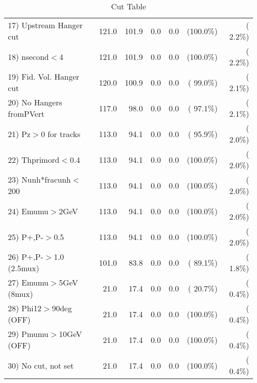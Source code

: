 \begin{table}[h!]
\begin{tabular}{||l||r|r|r|r|r|r||}
 17) Upstream Hanger cut  &        121.0 &        101.9 &          0.0 &          0.0 & (100.0\%) & (  2.2\%) \\
 18) nsecond$<$4          &        121.0 &        101.9 &          0.0 &          0.0 & (100.0\%) & (  2.2\%) \\
 19) Fid. Vol. Hanger cut &        120.0 &        100.9 &          0.0 &          0.0 & ( 99.0\%) & (  2.1\%) \\
 20) No Hangers fromPVert &        117.0 &         98.0 &          0.0 &          0.0 & ( 97.1\%) & (  2.1\%) \\
 21) Pz$>$0 for tracks    &        113.0 &         94.1 &          0.0 &          0.0 & ( 95.9\%) & (  2.0\%) \\
 22) Thprimord$<$0.4      &        113.0 &         94.1 &          0.0 &          0.0 & (100.0\%) & (  2.0\%) \\
 23) Nunh*fracunh$<$200   &        113.0 &         94.1 &          0.0 &          0.0 & (100.0\%) & (  2.0\%) \\
 24) Emumu$>$2GeV         &        113.0 &         94.1 &          0.0 &          0.0 & (100.0\%) & (  2.0\%) \\
 25) P+,P-$>$0.5          &        113.0 &         94.1 &          0.0 &          0.0 & (100.0\%) & (  2.0\%) \\
 26) P+,P-$>$1.0 (2.5mux) &        101.0 &         83.8 &          0.0 &          0.0 & ( 89.1\%) & (  1.8\%) \\
 27) Emumu$>$5GeV  (8mux) &         21.0 &         17.4 &          0.0 &          0.0 & ( 20.7\%) & (  0.4\%) \\
 28) Phi12$>$90deg  (OFF) &         21.0 &         17.4 &          0.0 &          0.0 & (100.0\%) & (  0.4\%) \\
 29) Pmumu$>$10GeV  (OFF) &         21.0 &         17.4 &          0.0 &          0.0 & (100.0\%) & (  0.4\%) \\
 30) No cut, not set      &         21.0 &         17.4 &          0.0 &          0.0 & (100.0\%) & (  0.4\%) \\
 \hline
 \hline
 \end{tabular}
 \caption{Cut Table           }
 \label{tab-cutcohjpsi-mumu_jpsi}
 \end{table}
